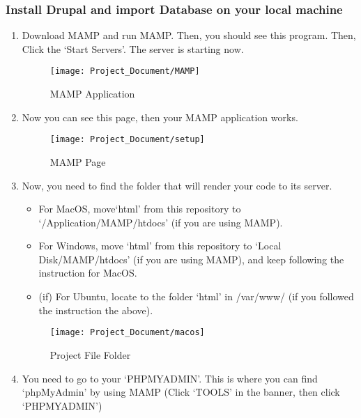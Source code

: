 \documentclass[10pt]{article}
\begin{document}
        \subsubsection{Install Drupal and import Database on your local machine}
            \begin{enumerate}
                \item Download MAMP and run MAMP. Then, you should see this program. Then, Click the `Start Servers’. The server is starting now.

                    \begin{figure}[!ht]
                        \centering
                        \texttt{[image: Project\_Document/MAMP]}
                        \caption{MAMP Application}
                    \end{figure}
\newpage
                \item Now you can see this page, then your MAMP application works.

                    \begin{figure}[!ht]
                        \centering
                        \texttt{[image: Project\_Document/setup]}
                        \caption{MAMP Page}
                    \end{figure}

                \item Now, you need to find the folder that will render your code to its server.

                    \begin{itemize}
                        \item For MacOS, move`html' from this repository to `/Application/MAMP/htdocs' (if you are using MAMP).
                        \item For Windows, move `html' from this repository to `Local Disk/MAMP/htdocs' (if you are using MAMP), and keep following the instruction for MacOS.
                        \item (if) For Ubuntu, locate to the folder `html' in /var/www/ (if you followed the instruction the above).
                    \end{itemize}

                    \begin{figure}[!ht]
                           \centering
                           \texttt{[image: Project\_Document/macos]}
                        \caption{Project File Folder}
                    \end{figure}
\newpage
                \item You need to go to your `PHPMYADMIN’. This is where you can find `phpMyAdmin' by using MAMP (Click `TOOLS' in the banner, then click `PHPMYADMIN')


\end{enumerate}
\end{document}

